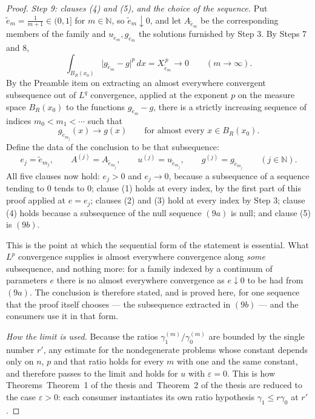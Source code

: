 \begin{proof}
\emph{Step 9: clauses (4) and (5), and the choice of the sequence.}  Put
$\tilde e_m=\frac1{m+1}\in(0,1]$ for $m\in\mathbb{N}$, so
$\tilde e_m\downarrow0$, and let $A_{\tilde e_m}$ be the corresponding members of
the family and $u_{\tilde e_m},g_{\tilde e_m}$ the solutions furnished by Step 3.
By Steps 7 and 8,
\[
\int_{B_R(x_0)}\bigl|g_{\tilde e_m}-g\bigr|^p\,dx=X_{\tilde e_m}^{\,p}
\longrightarrow0\qquad(m\to\infty).
\tag{9a}
\]
By the Preamble item on extracting an almost everywhere convergent subsequence
out of $L^q$ convergence, applied at the exponent $p$ on the measure space
$B_R(x_0)$ to the functions $g_{\tilde e_m}-g$, there is a strictly increasing
sequence of indices $m_0<m_1<\cdots$ such that
\[
g_{\tilde e_{m_j}}(x)\longrightarrow g(x)\qquad\text{for almost every }x\in B_R(x_0).
\tag{9b}
\]
Define the data of the conclusion to be that subsequence:
\[
e_j=\tilde e_{m_j},\qquad A^{(j)}=A_{\tilde e_{m_j}},\qquad
u^{(j)}=u_{\tilde e_{m_j}},\qquad g^{(j)}=g_{\tilde e_{m_j}}
\qquad(j\in\mathbb{N}).
\]
All five clauses now hold: $e_j>0$ and $e_j\to0$, because a subsequence of a
sequence tending to $0$ tends to $0$; clause (1) holds at every index, by the
first part of this proof applied at $e=e_j$; clauses (2) and (3) hold at every
index by Step 3; clause (4) holds because a subsequence of the null sequence
$(9a)$ is null; and clause (5) is $(9b)$.

This is the point at which the sequential form of the statement is essential.
What $L^p$ convergence supplies is almost everywhere convergence along
\emph{some} subsequence, and nothing more: for a family indexed by a continuum
of parameters $e$ there is no almost everywhere convergence as $e\downarrow0$ to
be had from $(9a)$.  The conclusion is therefore stated, and is proved here, for
one sequence that the proof itself chooses --- the subsequence extracted in
$(9b)$ --- and the consumers use it in that form.

\emph{How the limit is used.}  Because the ratios
$\gamma_1^{(m)}/\gamma_0^{(m)}$ are bounded by the single number $r'$, any
estimate for the nondegenerate problems whose constant depends only on $n$, $p$
and that ratio holds for every $m$ with one and the same constant, and therefore
passes to the limit and holds for $u$ with $\varepsilon=0$.  This is how
Theorems~Theorem~1 of the thesis and~Theorem~2 of the thesis are reduced to the case $\varepsilon>0$:
each consumer instantiates its own ratio hypothesis $\gamma_1\le r\gamma_0$ at
$r'$.
\end{proof}
